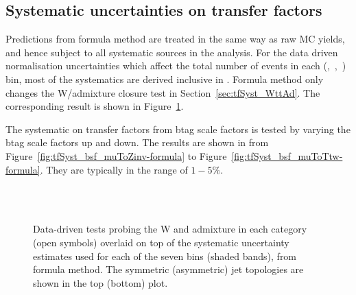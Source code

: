 \subsection{Systematic uncertainties on transfer factors\label{sec:btag-syst}}
Predictions from formula method are treated in the same way as raw MC yields, 
and hence subject to all systematic sources in the analysis. For the data driven normalisation 
uncertainties which affect the total number of events in each (\njet,~\nb,~\scalht) bin, 
most of the systematics are derived inclusive in \nb. Formula method only changes
the W/\ttbar admixture closure test in Section~\ref{sec:tfSyst_WttAd}. 
The corresponding result is shown in Figure~\ref{fig:closureBTag-formula}.

The systematic on transfer factors from btag scale factors is tested by varying 
the btag scale factors up and down. The results are shown in
 from Figure~\ref{fig:tfSyst_bsf_muToZinv-formula} to Figure~\ref{fig:tfSyst_bsf_muToTtw-formula}.
They are typically in the range of $1-5\%$.


\begin{figure}[h!]
  \begin{center}
     \\
    ~~
    \caption{Data-driven tests probing the W and \ttbar admixture 
      in each \njet category (open symbols) overlaid on top of the systematic
      uncertainty estimates used for each of the seven \scalht bins
      (shaded bands), from formula method.
      The symmetric (asymmetric) jet topologies are shown in the top (bottom) plot.      
    }
    \label{fig:closureBTag-formula}
  \end{center} 
\end{figure}


